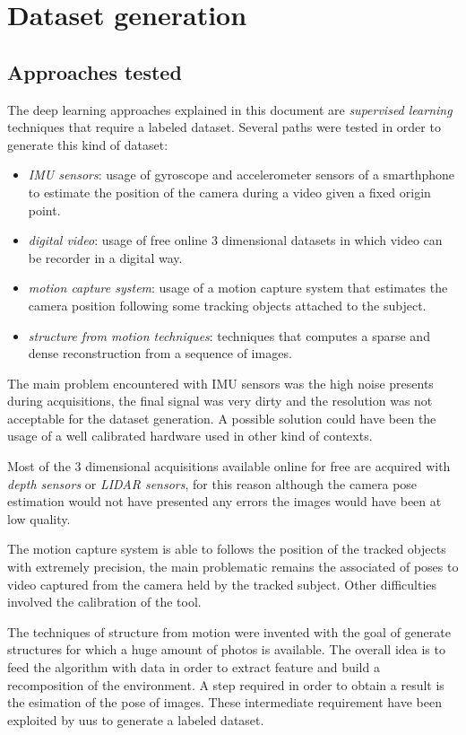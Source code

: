 \section{Dataset generation}
\subsection{Approaches tested}
The deep learning approaches explained in this document are \textit{supervised learning} techniques that require a labeled dataset. Several paths were tested in order to generate this kind of dataset:
\begin{itemize}
    \item \textit{IMU sensors}: usage of gyroscope and accelerometer sensors of a smarthphone to estimate the position of the camera during a video given a fixed origin point. 
    \item \textit{digital video}: usage of free online 3 dimensional datasets in which video can be recorder in a digital way.
    \item \textit{motion capture system}: usage of a motion capture system that estimates the camera position following some tracking objects attached to the subject.
    \item \textit{structure from motion techniques}: techniques that computes a sparse and dense reconstruction from a sequence of images.
\end{itemize}

The main problem encountered with IMU sensors was the high noise presents during acquisitions, the final signal was very dirty and the resolution was not acceptable for the dataset generation. A possible solution could have been the usage of a well calibrated hardware used in other kind of contexts.

Most of the 3 dimensional acquisitions available online for free are acquired with \textit{depth sensors} or \textit{LIDAR sensors}, for this reason although the camera pose estimation would not have presented any errors the images would have been at low quality.

The motion capture system is able to follows the position of the tracked objects with extremely precision, the main problematic remains the associated of poses to video captured from the camera held by the tracked subject. Other difficulties involved the calibration of the tool.

The techniques of structure from motion were invented with the goal of generate structures for which a huge amount of photos is available. The overall idea is to feed the algorithm with data in order to extract feature and build a recomposition of the environment. A step required in order to obtain a result is the esimation of the pose of images. These intermediate requirement have been exploited by uus to generate a labeled dataset.

